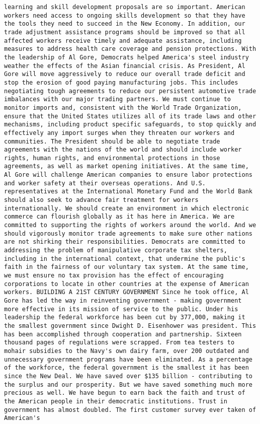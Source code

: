 \documentclass[
]{article}
\begin{document}
\begin{verbatim}
learning and skill development proposals are so important. American workers need access to ongoing skills development so that they have the tools they need to succeed in the New Economy. In addition, our trade adjustment assistance programs should be improved so that all affected workers receive timely and adequate assistance, including measures to address health care coverage and pension protections. With the leadership of Al Gore, Democrats helped America's steel industry weather the effects of the Asian financial crisis. As President, Al Gore will move aggressively to reduce our overall trade deficit and stop the erosion of good paying manufacturing jobs. This includes negotiating tough agreements to reduce our persistent automotive trade imbalances with our major trading partners. We must continue to monitor imports and, consistent with the World Trade Organization, ensure that the United States utilizes all of its trade laws and other mechanisms, including product specific safeguards, to stop quickly and effectively any import surges when they threaten our workers and communities. The President should be able to negotiate trade agreements with the nations of the world and should include worker rights, human rights, and environmental protections in those agreements, as well as market opening initiatives. At the same time, Al Gore will challenge American companies to ensure labor protections and worker safety at their overseas operations. And U.S. representatives at the International Monetary Fund and the World Bank should also seek to advance fair treatment for workers internationally. We should create an environment in which electronic commerce can flourish globally as it has here in America. We are committed to supporting the rights of workers around the world. And we should vigorously monitor trade agreements to make sure other nations are not shirking their responsibilities. Democrats are committed to addressing the problem of manipulative corporate tax shelters, including in the international context, that undermine the public's faith in the fairness of our voluntary tax system. At the same time, we must ensure no tax provision has the effect of encouraging corporations to locate in other countries at the expense of American workers. BUILDING A 21ST CENTURY GOVERNMENT Since he took office, Al Gore has led the way in reinventing government - making government more effective in its mission of service to the public. Under his leadership the federal workforce has been cut by 377,000, making it the smallest government since Dwight D. Eisenhower was president. This has been accomplished through cooperation and partnership. Sixteen thousand pages of regulations were scrapped. From tea testers to mohair subsidies to the Navy's own dairy farm, over 200 outdated and unnecessary government programs have been eliminated. As a percentage of the workforce, the federal government is the smallest it has been since the New Deal. We have saved over $135 billion - contributing to the surplus and our prosperity. But we have saved something much more precious as well. We have begun to earn back the faith and trust of the American people in their democratic institutions. Trust in government has almost doubled. The first customer survey ever taken of American's 
\end{verbatim}
\end{document}
